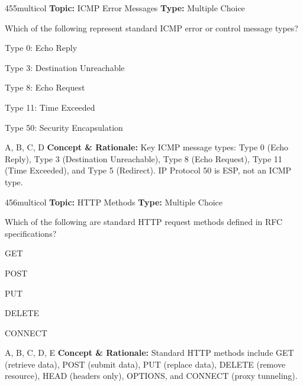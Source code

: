 \begin{qcard}{455}{multicol}
\textcolor{darkslate!75}{\small\textbf{Topic:} ICMP Error Messages \hfill \textbf{Type:} Multiple Choice}\vspace{0.4em}\par
Which of the following represent standard ICMP error or control message types?
\begin{qoptions}
\item Type 0: Echo Reply
\item Type 3: Destination Unreachable
\item Type 8: Echo Request
\item Type 11: Time Exceeded
\item Type 50: Security Encapsulation
\end{qoptions}
\end{qcard}
\nopagebreak
\begin{explainbox}{A, B, C, D}
\textbf{Concept \& Rationale:} Key ICMP message types: Type 0 (Echo Reply), Type 3 (Destination Unreachable), Type 8 (Echo Request), Type 11 (Time Exceeded), and Type 5 (Redirect). IP Protocol 50 is ESP, not an ICMP type.
\end{explainbox}

\begin{qcard}{456}{multicol}
\textcolor{darkslate!75}{\small\textbf{Topic:} HTTP Methods \hfill \textbf{Type:} Multiple Choice}\vspace{0.4em}\par
Which of the following are standard HTTP request methods defined in RFC specifications?
\begin{qoptions}
\item GET
\item POST
\item PUT
\item DELETE
\item CONNECT
\end{qoptions}
\end{qcard}
\nopagebreak
\begin{explainbox}{A, B, C, D, E}
\textbf{Concept \& Rationale:} Standard HTTP methods include GET (retrieve data), POST (submit data), PUT (replace data), DELETE (remove resource), HEAD (headers only), OPTIONS, and CONNECT (proxy tunneling).
\end{explainbox}

